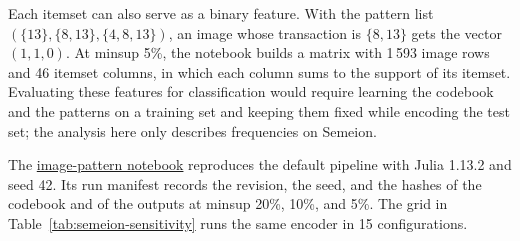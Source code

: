 Each itemset can also serve as a binary feature. With the pattern list
$(\{13\},\{8,13\},\{4,8,13\})$, an image whose transaction is $\{8,13\}$ gets the vector
$(1,1,0)$. At minsup 5\%, the notebook builds a matrix with 1\,593 image rows and 46
itemset columns, in which each column sums to the support of its itemset. Evaluating these
features for classification would require learning the codebook and the patterns on a
training set and keeping them fixed while encoding the test set; the analysis here only
describes frequencies on Semeion.

The \href{https://github.com/NgTHung/Itemset/blob/main/notebooks/image_patterns_colab.ipynb}
{image-pattern notebook} reproduces the default pipeline with Julia 1.13.2 and seed 42.
Its run manifest records the revision, the seed, and the hashes of the codebook and of the
outputs at minsup 20\%, 10\%, and 5\%. The grid in Table~\ref{tab:semeion-sensitivity}
runs the same encoder in 15 configurations.

